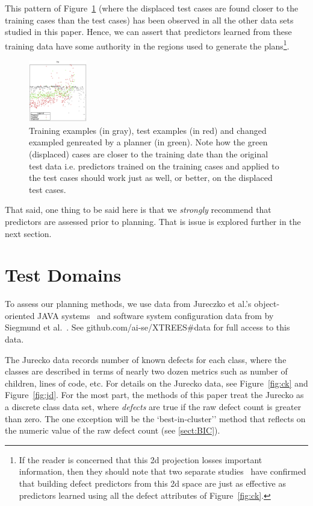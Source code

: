 \documentclass{sig-alternate}
\newcommand{\tion}[1]{\textsection\ref{sect:#1}}
\newcommand{\fig}[1]{Figure~\ref{fig:#1}}
\begin{document}
This pattern of \fig{howxy} (where the displaced test cases are found closer to  the training cases than the test cases) has been observed in all the other data sets studied in this
paper. Hence,  we can assert that
predictors learned from these training data have some authority in the regions
used to generate the plans\footnote{If the reader is concerned that this 2d projection
losses important information, then they should note that two separate  studies~\cite{papa13,divya15}
have confirmed that building defect predictors from this 2d space are just as effective
as predictors learned using all the defect attributes of \fig{ck}.}. 


\begin{figure}
\includegraphics[width=1in]{_figs/2d.png} 
\caption{Training examples (in gray), test examples (in red) and 
changed exampled genreated by a planner (in green). Note how the green (displaced) cases are closer to the  training
date than the original test data
i.e. predictors trained on the training cases and
applied to the test cases should
work just as well, or better, on the displaced test cases.}\label{fig:howxy}
\end{figure}

That said, one thing to be said here
is that we {\em strongly} recommend that predictors are assessed prior to planning. That is
issue is explored further in the next section. 



  \section{Test Domains}
To assess our planning methods, we use data from Jureczko et al.'s object-oriented JAVA systems~\cite{jureczko10}  and
  software system   configuration data from by  Siegmund et al.~\cite{sven12}.
  See github.com/ai-se/XTREES\#data for full access to this data.
  
  
   The Jurecko data records number of known defects for each class, where the classes are described in terms of
  nearly two dozen metrics such as number of children, lines of code, etc. For details on the Jurecko data, see  \fig{ck} and \fig{jd}. 
 For the most part, the methods of this paper treat
  the Jurecko as a discrete class data set, where {\em defects} are true if the raw defect count is greater than zero.
  The one exception will be the `best-in-cluster'' method that reflects on the numeric value of the raw defect count (see \tion{BIC}).
\end{document}
